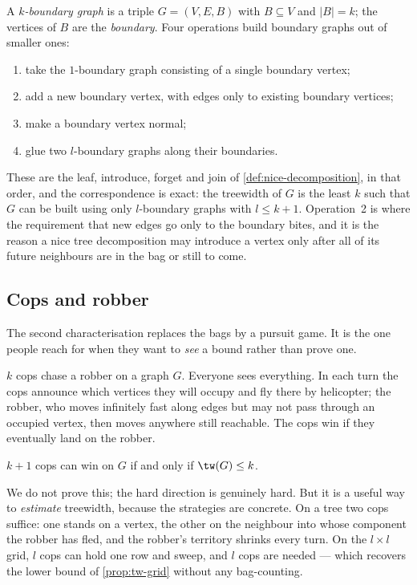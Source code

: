 A \emph{$k$-boundary graph} is a triple $G = (V,E,B)$ with $B \subseteq V$ and
$|B| = k$; the vertices of $B$ are the \emph{boundary}. Four operations build
boundary graphs out of smaller ones:
\begin{enumerate}[leftmargin=*,nosep]
  \item take the $1$-boundary graph consisting of a single boundary vertex;
  \item add a new boundary vertex, with edges only to existing boundary
        vertices;
  \item make a boundary vertex normal;
  \item glue two $l$-boundary graphs along their boundaries.
\end{enumerate}
These are the leaf, introduce, forget and join of
\cref{def:nice-decomposition}, in that order, and the correspondence is exact:
the treewidth of $G$ is the least $k$ such that $G$ can be built using only
$l$-boundary graphs with $l \le k+1$. Operation~2 is where the requirement that
new edges go only to the boundary bites, and it is the reason a nice tree
decomposition may introduce a vertex only after all of its future neighbours
are in the bag or still to come.

\subsection{Cops and robber}

The second characterisation replaces the bags by a pursuit game. It is the one
people reach for when they want to \emph{see} a bound rather than prove one.

\begin{definition}\label{def:cops-robber}
$k$ cops chase a robber on a graph $G$. Everyone sees everything. In each turn
the cops announce which vertices they will occupy and fly there by helicopter;
the robber, who moves infinitely fast along edges but may not pass through an
occupied vertex, then moves anywhere still reachable. The cops win if they
eventually land on the robber.
\end{definition}

\begin{theorem}\label{thm:cops-robber}
$k+1$ cops can win on $G$ if and only if $\tw(G) \le k$.
\end{theorem}

We do not prove this; the hard direction is genuinely hard. But it is a useful
way to \emph{estimate} treewidth, because the strategies are concrete. On a
tree two cops suffice: one stands on a vertex, the other on the neighbour into
whose component the robber has fled, and the robber's territory shrinks every
turn. On the $l \times l$ grid, $l$ cops can hold one row and sweep, and $l$
cops are needed --- which recovers the lower bound of \cref{prop:tw-grid}
without any bag-counting.

